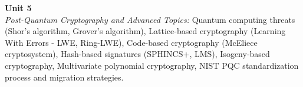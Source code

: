 \vspace{0.3cm}

\noindent\textbf{Unit 5} \\
\textit{Post-Quantum Cryptography and Advanced Topics:} Quantum computing threats (Shor's algorithm, Grover's algorithm), Lattice-based cryptography (Learning With Errors - LWE, Ring-LWE), Code-based cryptography (McEliece cryptosystem), Hash-based signatures (SPHINCS+, LMS), Isogeny-based cryptography, Multivariate polynomial cryptography, NIST PQC standardization process and migration strategies.

\newpage
{}
